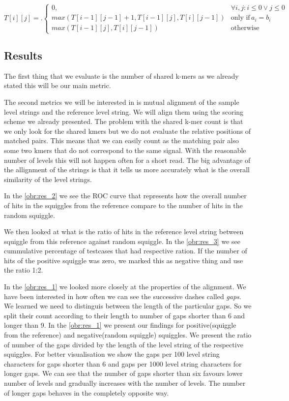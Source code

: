 \[
T[i][j] = \bigl.
  \begin{cases}
    0, & \forall i,j : i\leq 0 \lor j\leq 0 \\
    max(T[i-1][j-1] + 1, T[i-1][j], T[i][j-1]) & \text{only if} \, a_i = b_i \\ 
    max(T[i-1][j], T[i][j-1]) & \text{otherwise}
  \end{cases}
\]

\subsection{Results}

The first thing that we evaluate is the number of shared k-mers as we already
stated this will be our main metric.

The second metrics we will be interested in is mutual alignment of the sample
level strings and the reference level string. We will align them using the scoring
scheme we already presented. The problem with the shared k-mer count is that we only look
for the shared kmers but we do not evaluate the relative positions of matched pairs.
This means that we can easily count as the matching pair also some two kmers that
do not correspond to the same signal. With the reasonable number of levels this will
not happen often for a short read. The big advantage of the allignment of the strings
is that it tells us more accurately what is the overall similarity of the level strings.

In the \ref{obr:res_2} we see the ROC curve that represents how the overall number
of hits in the squiggles from the reference compare to the number of hits in the
random squiggle.

We then looked at what is the ratio of hits in the reference level string between squiggle
from this reference against random squiggle. In the \ref{obr:res_3} we see cummulative percentage
of testcases that had respective ration. If the number of hits of the positive squiggle
was zero, we marked this as negative thing and use the ratio 1:2.

In the \ref{obr:res_1} we looked more closely at the properties of the alignment. We
have been interested in how often we can see the successive dashes called \textit{gaps}.
We learned we need to distinguis between the length of the particular gaps. So we split
their count according to their length to number of gaps shorter than 6 and longer than 9.
In the \ref{obr:res_1} we present our findings for positive(squiggle from the reference)
and negative(random squiggle) squiggles. We present the ratio of number of the gaps divided
by the length of the level string of the respective squiggles. For better visualisation
we show the gaps per 100 level string characters for gaps shorter than 6 and gaps
per 1000 level string characters for longer gaps. We can see that the number of gaps
shorter than six favours lower number of levels and gradually increases with the number
of levels. The number of longer gaps behaves in the completely opposite way. 

